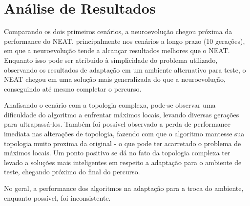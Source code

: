 \section{Análise de Resultados}

Comparando os dois primeiros cen{\'a}rios, a
neuroevolu{\c c}{\~a}o chegou próxima da
performance do NEAT, principalmente nos
cen{\'a}rios a longo prazo (10 gera{\c
c}{\~o}es), em que a neuroevolu{\c c}{\~a}o
tende a alcan{\c c}ar resultados
melhores que o NEAT. Enquanto isso pode ser
atribuido {\`a} simplicidade do problema
utilizado, observando os resultados de adapta{\c
c}{\~a}o em um ambiente alternativo para teste, o
NEAT chegou em uma solu{\c c}{\~a}o mais
generalizada do que a neuroevolu{\c c}{\~a}o,
conseguindo at{\'e} mesmo completar o percurso.

Analisando o cen{\'a}rio com a topologia
complexa, pode-se observar uma dificuldade do
algoritmo a enfrentar m{\'a}ximos locais,
levando diversas gera{\c c}{\~o}es para
ultrapass{\'a}-los. Tamb{\'e}m foi possível
observado a perda de performance imediata nas
altera{\c c}{\~o}es de topologia, fazendo com
que o algoritmo mantesse sua topologia muito
proxima da original - o que pode ter acarretado
o problema de m{\'a}ximos locais. Um ponto
positivo se dá no fato da topologia complexa ter levado a
solu{\c c}{\~o}es mais inteligentes em respeito
a adapta{\c c}{\~a}o para o ambiente de teste,
chegando pr{\'o}ximo do final do percurso.

No geral, a performance dos algoritmos na
adapta{\c c}{\~a}o para a troca do ambiente,
enquanto poss{\'i}vel, foi inconsistente.
